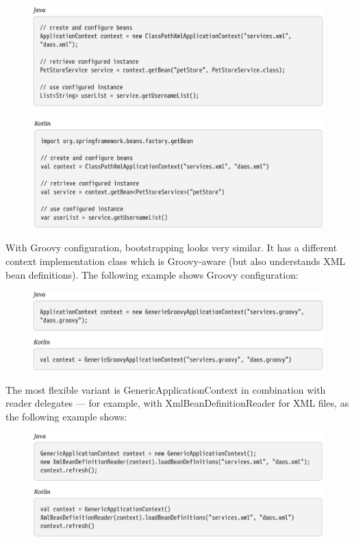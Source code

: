 \begin{figure}[ht]
    \centering
    \includegraphics[width=1\linewidth]{./Figure/IMG_code_7.png}
\end{figure}

\newpage
\begin{figure}[ht]
    \centering
    \includegraphics[width=1\linewidth]{./Figure/IMG_code_8.png}
\end{figure}

With Groovy configuration, bootstrapping looks very similar. It has a different context
implementation class which is Groovy-aware (but also understands XML bean definitions). The
following example shows Groovy configuration:

\begin{figure}[ht]
    \centering
    \includegraphics[width=1\linewidth]{./Figure/IMG_code_9.png}
\end{figure}

The most flexible variant is GenericApplicationContext in combination with reader delegates — for
example, with XmlBeanDefinitionReader for XML files, as the following example shows:

\begin{figure}[ht]
    \centering
    \includegraphics[width=1\linewidth]{./Figure/IMG_code_10.png}
\end{figure}

